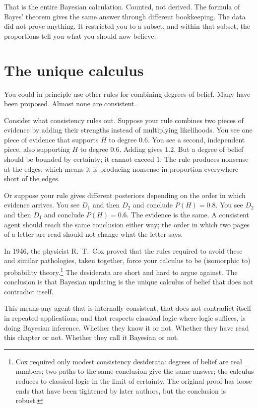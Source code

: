 That is the entire Bayesian calculation. Counted, not derived. The formula of Bayes' theorem gives the same answer through different bookkeeping. The data did not prove anything. It restricted you to a subset, and within that subset, the proportions tell you what you should now believe.

\section*{The unique calculus}

You could in principle use other rules for combining degrees of belief. Many have been proposed. Almost none are consistent.

Consider what consistency rules out. Suppose your rule combines two pieces of evidence by adding their strengths instead of multiplying likelihoods. You see one piece of evidence that supports $H$ to degree $0.6$. You see a second, independent piece, also supporting $H$ to degree $0.6$. Adding gives $1.2$. But a degree of belief should be bounded by certainty; it cannot exceed $1$. The rule produces nonsense at the edges, which means it is producing nonsense in proportion everywhere short of the edges.

Or suppose your rule gives different posteriors depending on the order in which evidence arrives. You see $D_1$ and then $D_2$ and conclude $P(H) = 0.8$. You see $D_2$ and then $D_1$ and conclude $P(H) = 0.6$. The evidence is the same. A consistent agent should reach the same conclusion either way; the order in which two pages of a letter are read should not change what the letter says.

In 1946, the physicist R.\ T.\ Cox proved that the rules required to avoid these and similar pathologies, taken together, force your calculus to be (isomorphic to) probability theory.\footnote{Cox required only modest consistency desiderata: degrees of belief are real numbers; two paths to the same conclusion give the same answer; the calculus reduces to classical logic in the limit of certainty. The original proof has loose ends that have been tightened by later authors, but the conclusion is robust.} The desiderata are short and hard to argue against. The conclusion is that Bayesian updating is the unique calculus of belief that does not contradict itself.

This means any agent that is internally consistent, that does not contradict itself in repeated applications, and that respects classical logic where logic suffices, is doing Bayesian inference. Whether they know it or not. Whether they have read this chapter or not. Whether they call it Bayesian or not.

